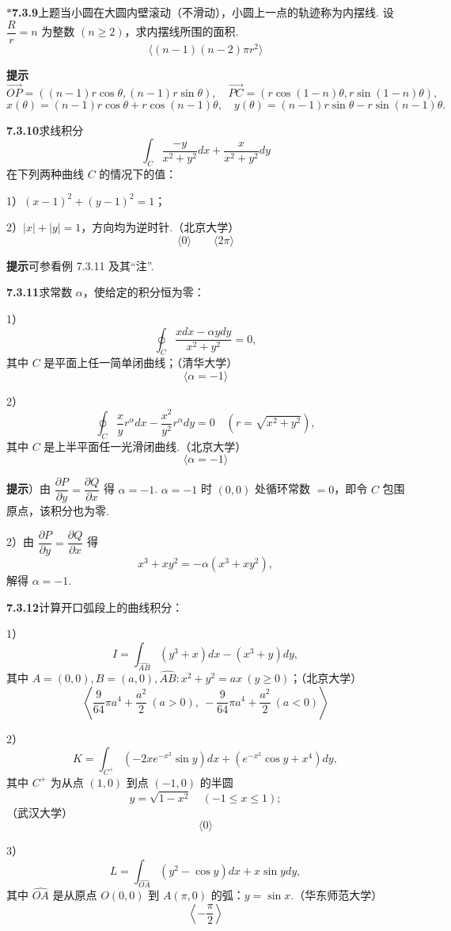 \documentclass[UTF8, 12pt, fontset=fandol, oneside]{ctexart}
\begin{document}
\noindent\textbf{$*$7.3.9}\quad 上题当小圆在大圆内壁滚动（不滑动），小圆上一点的轨迹称为内摆线. 设 $\dfrac Rr=n$ 为整数 $(n\ge2)$，求内摆线所围的面积.
\[
\langle (n-1)(n-2)\pi r^2\rangle
\]

\noindent\textbf{提示}\quad
\[
\overrightarrow{OP}=((n-1)r\cos\theta,(n-1)r\sin\theta),
\quad
\overrightarrow{PC}=(r\cos(1-n)\theta,r\sin(1-n)\theta),
\]
\[
x(\theta)=(n-1)r\cos\theta+r\cos(n-1)\theta,\quad
y(\theta)=(n-1)r\sin\theta-r\sin(n-1)\theta.
\]

\noindent\textbf{7.3.10}\quad 求线积分
\[
\int_C\frac{-y}{x^2+y^2}dx+\frac{x}{x^2+y^2}dy
\]
在下列两种曲线 $C$ 的情况下的值：

1）$(x-1)^2+(y-1)^2=1$；

2）$|x|+|y|=1$，方向均为逆时针.（北京大学）
\[
\langle0\rangle\qquad \langle2\pi\rangle
\]

\noindent\textbf{提示}\quad 可参看例 7.3.11 及其“注”.

\noindent\textbf{7.3.11}\quad 求常数 $\alpha$，使给定的积分恒为零：

1）
\[
\oint_C\frac{xdx-\alpha ydy}{x^2+y^2}=0,
\]
其中 $C$ 是平面上任一简单闭曲线；（清华大学）
\[
\langle\alpha=-1\rangle
\]

2）
\[
\oint_C\frac xy r^\alpha dx-\frac{x^2}{y^2}r^\alpha dy=0
\quad\left(r=\sqrt{x^2+y^2}\right),
\]
其中 $C$ 是上半平面任一光滑闭曲线.（北京大学）
\[
\langle\alpha=-1\rangle
\]

\noindent\textbf{提示}）由 $\dfrac{\partial P}{\partial y}=\dfrac{\partial Q}{\partial x}$ 得 $\alpha=-1$. $\alpha=-1$ 时 $(0,0)$ 处循环常数 $=0$，即令 $C$ 包围原点，该积分也为零.

2）由 $\dfrac{\partial P}{\partial y}=\dfrac{\partial Q}{\partial x}$ 得
\[
x^3+xy^2=-\alpha(x^3+xy^2),
\]
解得 $\alpha=-1$.

\noindent\textbf{7.3.12}\quad 计算开口弧段上的曲线积分：

1）
\[
I=\int_{\widehat{AB}}(y^3+x)dx-(x^3+y)dy,
\]
其中 $A=(0,0),B=(a,0),\widehat{AB}:x^2+y^2=ax\ (y\ge0)$；（北京大学）
\[
\left\langle \frac9{64}\pi a^4+\frac{a^2}2\ (a>0),\ -\frac9{64}\pi a^4+\frac{a^2}2\ (a<0)\right\rangle
\]

2）
\[
K=\int_{C^+}(-2xe^{-x^2}\sin y)dx+(e^{-x^2}\cos y+x^4)dy,
\]
其中 $C^+$ 为从点 $(1,0)$ 到点 $(-1,0)$ 的半圆
\[
y=\sqrt{1-x^2}\quad(-1\le x\le1);
\]
（武汉大学）
\[
\langle0\rangle
\]

3）
\[
L=\int_{\widehat{OA}}(y^2-\cos y)dx+x\sin ydy,
\]
其中 $\widehat{OA}$ 是从原点 $O(0,0)$ 到 $A(\pi,0)$ 的弧：$y=\sin x$.（华东师范大学）
\[
\left\langle-\frac\pi2\right\rangle
\]
\end{document}
